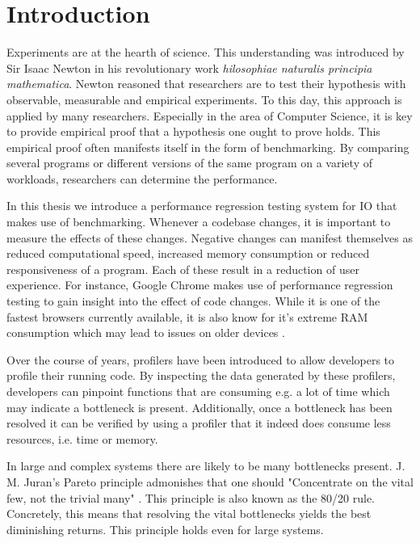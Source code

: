 \chapter{Introduction}
\label{chp:introduction}

Experiments are at the hearth of science.
This understanding was introduced by Sir Isaac Newton in his revolutionary work \emph{hilosophiae naturalis principia mathematica}.
Newton reasoned that researchers are to test their hypothesis with observable, measurable and empirical experiments.
To this day, this approach is applied by many researchers.
Especially in the area of Computer Science, it is key to provide empirical proof that a hypothesis one ought to prove holds.
This empirical proof often manifests itself in the form of benchmarking.
By comparing several programs or different versions of the same program on a variety of workloads, researchers can determine the performance.

In this thesis we introduce a performance regression testing system for IO that makes use of benchmarking.
Whenever a codebase changes, it is important to measure the effects of these changes.
Negative changes can manifest themselves as reduced computational speed, increased memory consumption or reduced responsiveness of a program.
Each of these result in a reduction of user experience.
For instance, Google Chrome makes use of performance regression testing to gain insight into the effect of code changes.
While it is one of the fastest browsers currently available, it is also know for it's extreme RAM consumption which may lead to issues on older devices \cite{ram2012chrome}.

Over the course of years, profilers have been introduced to allow developers to profile their running code.
By inspecting the data generated by these profilers, developers can pinpoint functions that are consuming e.g. a lot of time which may indicate a bottleneck is present.
Additionally, once a bottleneck has been resolved it can be verified by using a profiler that it indeed does consume less resources, i.e. time or memory.

In large and complex systems there are likely to be many bottlenecks present.
J. M. Juran's Pareto principle admonishes that one should "Concentrate on the vital few, not the trivial many" \cite{ammons2004finding}. This principle is also known as the 80/20 rule.
Concretely, this means that resolving the vital bottlenecks yields the best diminishing returns.
This principle holds even for large systems.

